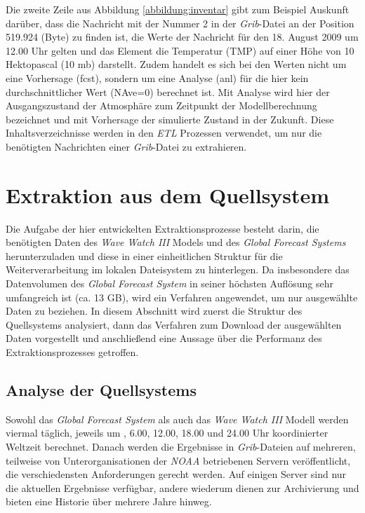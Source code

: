Die zweite Zeile aus Abbildung \ref{abbildung:inventar} gibt zum
Beispiel Auskunft darüber, dass die Nachricht mit der Nummer 2 in der
\textit{Grib}-Datei an der Position 519.924 (Byte) zu finden ist, die
Werte der Nachricht für den 18. August 2009 um 12.00 Uhr gelten und
das Element die Temperatur (TMP) auf einer Höhe von 10 Hektopascal (10
mb) darstellt. Zudem handelt es sich bei den Werten nicht um eine
Vorhersage (fcst), sondern um eine Analyse (anl) für die hier kein
durchschnittlicher Wert (NAve=0) berechnet ist. Mit Analyse wird hier
der Ausgangszustand der Atmosphäre zum Zeitpunkt der Modellberechnung
bezeichnet und mit Vorhersage der simulierte Zustand in der
Zukunft. Diese Inhaltsverzeichnisse werden in den \textit{ETL}
Prozessen verwendet, um nur die benötigten Nachrichten einer
\textit{Grib}-Datei zu extrahieren.

\section{Extraktion aus dem Quellsystem}
Die Aufgabe der hier entwickelten Extraktionsprozesse besteht darin,
die benötigten Daten des \textit{Wave Watch III} Models und des
\textit{Global Forecast Systems} herunterzuladen und diese in einer
einheitlichen Struktur für die Weiterverarbeitung im lokalen
Dateisystem zu hinterlegen. Da insbesondere das Datenvolumen des
\textit{Global Forecast System} in seiner höchsten Auflösung sehr
umfangreich ist (ca. 13 GB), wird ein Verfahren angewendet, um nur
ausgewählte Daten zu beziehen. In diesem Abschnitt wird zuerst die
Struktur des Quellsystems analysiert, dann das Verfahren zum Download
der ausgewählten Daten vorgestellt und anschließend eine Aussage über
die Performanz des Extraktionsprozesses getroffen.

\subsection{Analyse der Quellsystems}
Sowohl das \textit{Global Forecast System} als auch das \textit{Wave
  Watch III} Modell werden viermal täglich, jeweils um , 6.00, 12.00,
18.00 und 24.00 Uhr koordinierter Weltzeit berechnet. Danach werden
die Ergebnisse in \textit{Grib}-Dateien auf mehreren, teilweise von
Unterorganisationen der \textit{NOAA} betriebenen Servern
veröffentlicht, die verschiedensten Anforderungen gerecht werden. Auf
einigen Server sind nur die aktuellen Ergebnisse verfügbar, andere
wiederum dienen zur Archivierung und bieten eine Historie über mehrere
Jahre hinweg.


